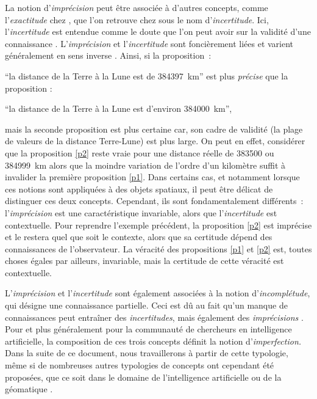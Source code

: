 La notion d’\emph{imprécision} peut être associée à d’autres concepts,
comme l’\emph{exactitude} chez \textcite{Russell1923}, que l’on
retrouve chez \textcite{Bouchon-Meunier1995, Bouchon-Meunier2007} sous
le nom d’\emph{incertitude}. Ici, l’\emph{incertitude} est entendue
comme le doute que l’on peut avoir sur la validité d’une connaissance
\autocite{Bouchon-Meunier1995}. L’\emph{imprécision} et
l’\emph{incertitude} sont foncièrement liées et varient généralement
en sens inverse \autocite{Russell1923}. Ainsi, si la proposition :
%
\begin{enumerate*}[label=(\alph*)]
\item \enquote{la distance de la Terre à la Lune est de
    \SI{384397}{\kilo\meter}} est plus \emph{précise} que la
  proposition : \label{p1}
\item \enquote{la distance de la Terre à la Lune est d’environ
\SI{384000}{\kilo\meter}}, \label{p2}
\end{enumerate*}
%
mais la seconde proposition est plus \textsf{certaine} car, son cadre
de validité (la plage de valeurs de la distance Terre-Lune) est plus
large. On peut en effet, considérer que la proposition \ref{p2} reste
vraie pour une distance réelle de \num{383500} ou
\SI{384999}{\kilo\meter} alors que la moindre variation de l’ordre
d’un kilomètre suffit à invalider la première proposition
\ref{p1}. Dans certains cas, et notamment lorsque ces notions sont
appliquées à des objets spatiaux, il peut être délicat de distinguer
ces deux concepts. Cependant, ils sont fondamentalement différents :
l’\emph{imprécision} est une caractéristique invariable, alors que
l’\emph{incertitude} est contextuelle. Pour reprendre l’exemple
précédent, la proposition \ref{p2} est imprécise et le restera quel
que soit le contexte, alors que sa certitude dépend des connaissances
de l’observateur. La véracité des propositions \ref{p1} et \ref{p2}
est, toutes choses égales par ailleurs, invariable, mais la certitude
de cette véracité est contextuelle.

L’\emph{imprécision} et l’\emph{incertitude} sont également associées
à la notion d’\emph{incomplétude}, qui désigne une connaissance
partielle. Ceci est dû au fait qu’un manque de connaissances peut
entraîner des \emph{incertitudes}, mais également des
\emph{imprécisions}
\autocite{Bouchon-Meunier1995,Bouchon-Meunier2007}. Pour
\textcite{Bouchon-Meunier1995} et plus généralement pour la communauté
de chercheurs en intelligence artificielle, la composition de ces
trois concepts définit la notion d’\emph{imperfection.} Dans la suite
de ce document, nous travaillerons à partir de cette typologie, même
si de nombreuses autres typologies de concepts ont cependant été
proposées, que ce soit dans le domaine de l’intelligence artificielle
ou de la géomatique \autocite{Fisher2006,Devilliers2019}.

